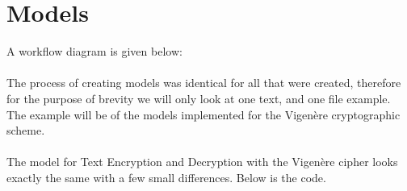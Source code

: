 \documentclass[a4paper, 12pt, titlepage]{report}
\begin{document}
\section{Models}
A workflow diagram is given below:\\\\
%
The process of creating models was identical for all that were created, therefore for the purpose of brevity we will only look at one text, and one file example. The example will be of the models implemented for the Vigenère cryptographic scheme.\\\\
The model for Text Encryption and Decryption with the Vigenère cipher looks exactly the same with a few small differences. Below is the code.
\end{document}
